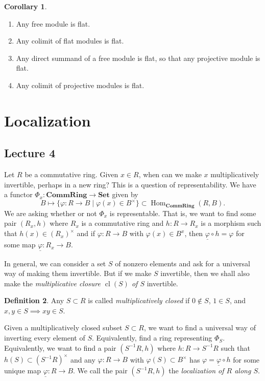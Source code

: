 \documentclass[10pt,letterpaper,cm]{nupset}
\theoremstyle{definition}
\newtheorem{definition}{Definition}[subsection]
\theoremstyle{theorem}
\newtheorem{corollary}[definition]{Corollary}
\theoremstyle{remark}
\newcommand{\1}{\mathbf{1}}
\newcommand{\0}{\vec 0}
\DeclareMathOperator{\cl}{cl}
\DeclareMathOperator{\Hom}{Hom}
\begin{document}
\begin{corollary} $ $
\begin{enumerate}
\item Any free module is flat.
\item Any colimit of flat modules is flat.
\item Any direct summand of a free module is flat, so that any projective module is flat.
\item Any colimit of projective modules is flat. 
\end{enumerate}
\end{corollary}

\section{Localization}

\subsection{Lecture 4}

Let $R$ be a commutative ring. Given $x\in R$, when can we make $x$ multiplicatively invertible, perhaps in a new ring? This is a question of representability. We have a functor $\Phi_x : \mathbf{CommRing} \to \mathbf{Set}$ given by $$B \mapsto \{\varphi : R \to B \mid \varphi(x) \in B^{\times}\} \subset \Hom_{\mathbf{CommRing}}(R, B).$$ We are asking whether or not $\Phi_x$ is representable. That is, we want to find some pair $\left(R_x, h\right)$ where $R_x$ is a commutative ring and $h: R \to R_x$ is a morphism such that $h(x) \in (R_x)^{\times}$ and if $\varphi : R \to B$ with $\varphi(x) \in B^x$, then $\underline{\varphi}  \circ h= \varphi$ for some  map $\underline{\varphi} : R_x \to B$.

In general, we can consider a set $S$ of nonzero elements and ask for a universal way of making them invertible. But if we make $S$ invertible, then we shall also make the \textit{multiplicative closure $\cl(S)$ of $S$} invertible.

\begin{definition}
Any $S\subset R$ is called \textit{multiplicatively closed} if $0\notin S$, $1\in S$, and $x,y\in S \implies xy\in S$.
\end{definition}

Given a multiplicatively closed subset $S \subset R$, we want to find a universal way of inverting every element of $S$. Equivalently, find a ring representing $\Phi_S$. Equivalently, we want to find a pair $\left(S^{-1}R, h\right)$ where  $h: R\to S^{-1}R$ such that $h(S) \subset (S^{-1}R)^{\times}$ and any $\varphi : R \to B$ with $\varphi(S) \subset B^{\times}$ has $\varphi = \underline{\varphi} \circ h$ for some unique map $ \underline{\varphi} : R \to B$.  We call the pair $\left(S^{-1}R, h\right)$ the \textit{localization of $R$ along $S$}.
\end{document}

